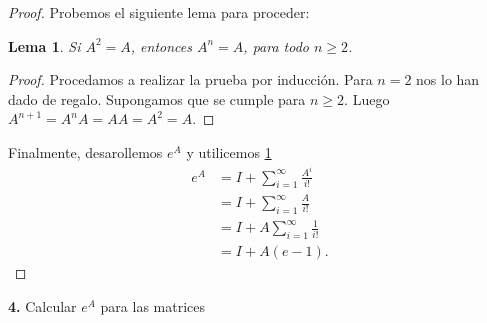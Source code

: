\documentclass{article}
\newenvironment{statement}[1]{\smallskip\noindent\color[rgb]{1.00,0.00,0.50} {\bf #1.}}{}
\newtheorem{lemma}[theorem]{Lema}
\theoremstyle{definition}
\theoremstyle{remark}
\begin{document}
\begin{proof}
  Probemos el siguiente lema para proceder:
  \begin{lemma}\label{lem01}
    Si $A^2 = A$, entonces $A^n = A$, para todo $n \geq 2$.
  \end{lemma}
  \begin{proof}
    Procedamos a realizar la prueba por inducci\'on.
    Para $n = 2$ nos lo han dado de regalo.
    Supongamos que se cumple para $n \geq 2$.
    Luego $A^{n + 1} = A^n A = A A = A^2 = A$.
  \end{proof}
  Finalmente, desarollemos $e^A$ y utilicemos \cref{lem01}
  \begin{align*}
    e^A &= I + \sum_{i = 1}^{\infty} \frac{A^i}{i!}\\
    &= I + \sum_{i = 1}^{\infty} \frac{A}{i!}\\
    &= I + A \sum_{i = 1}^{\infty} \frac{1}{i!}\\
    &= I + A (e - 1).
  \end{align*}
\end{proof}

\begin{statement}{4}
  Calcular $e^A$ para las matrices
\end{statement}
\end{document}
